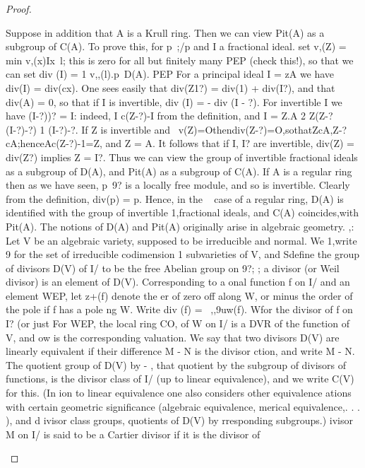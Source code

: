 \begin{proof}
\begin{mathematicalrecord}
   Suppose in addition that A is a Krull ring. Then we can view Pit(A)
as a subgroup of C(A). To prove this, for p~;/p and I a fractional ideal.
set
         v,(Z) = min {v,(x)Ix~l};
this is zero for all but finitely many PEP (check this!), so that we can set
         div (I) = 1 v,,(l).p~D(A).
                   PEP
For a principal ideal I = zA we have div(I) = div(cx). One sees easily that
div(Z1?) = div(1) + div(I?), and that div(A) = 0, so that if I is invertible,
div (I) = - div (I - ?).
For invertible I we have (I-?))?          = I: indeed, I c(Z-?)-I       from the
  definition, and I = Z.A 2 Z(Z-?(I-?)-?)          1 (I-?)-?. If Z is invertible and
  ~v(Z)=Othendiv(Z-?)=O,sothatZcA,Z-?cA;henceAc(Z-?)-1=Z,
  and Z = A. It follows that if I, I? are invertible, div(Z) = div(Z?) implies Z = I?.
  Thus we can view the group of invertible fractional ideals as a subgroup of
  D(A), and Pit(A) as a subgroup of C(A).
     If A is a regular ring then as we have seen, p~9? is a locally free module,
  and so is invertible. Clearly from the definition, div(p) = p. Hence, in the
~ case of a regular ring, D(A) is identified with the group of invertible
1,fractional ideals, and C(A) coincides,with Pit(A).
     The notions of D(A) and Pit(A) originally arise in algebraic geometry.
,: Let V be an algebraic variety, supposed to be irreducible and normal. We
1,write 9 for the set of irreducible codimension 1 subvarieties of V, and
Sdefine the group of divisors D(V) of I/ to be the free Abelian group on 9?;
; a divisor (or Weil divisor) is an element of D(V). Corresponding to a
       onal function f on I/ and an element WEP, let z+(f) denote the
       er of zero off along W, or minus the order of the pole if f has a pole
       ng W. Write div (f) = ~,,9uw(f). Wfor the divisor of f on I? (or just
         For WEP, the local ring CO, of W on I/ is a DVR of the function
         of V, and ow is the corresponding valuation. We say that two divisors
            D(V) are linearly equivalent if their difference M - N is the divisor
              ction, and write M - N. The quotient group of D(V) by - , that
          quotient by the subgroup of divisors of functions, is the divisor class
            of I/ (up to linear equivalence), and we write C(V) for this. (In
         ion to linear equivalence one also considers other equivalence
      ations with certain geometric significance (algebraic equivalence,
      merical equivalence,. . . ), and d ivisor class groups, quotients of D(V) by
           rresponding subgroups.)
           ivisor M on I/ is said to be a Cartier divisor if it is the divisor of

\end{mathematicalrecord}
\end{proof}
